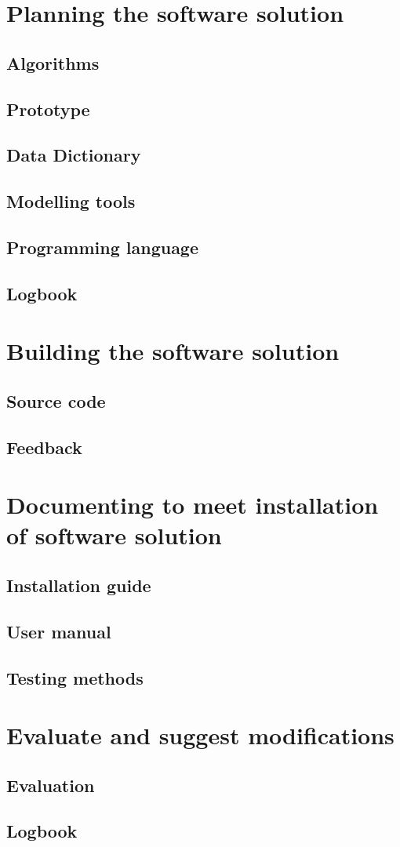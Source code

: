 \documentclass{article}
\begin{document}
\section{Planning the software solution}
\subsection{Algorithms}
\subsection{Prototype}
\subsection{Data Dictionary}
\subsection{Modelling tools}
\subsection{Programming language}
\subsection{Logbook}
\section{Building the software solution}
\subsection{Source code}
\subsection{Feedback}
\section{Documenting to meet installation of software solution}
\subsection{Installation guide}
\subsection{User manual}
\subsection{Testing methods}
\section{Evaluate and suggest modifications}
\subsection{Evaluation}
\subsection{Logbook}
\end{document}
